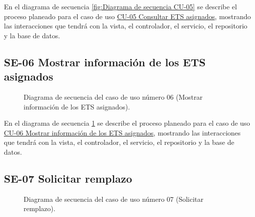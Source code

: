 En el diagrama de secuencia \ref{fig:Diagrama de secuencia CU-05} se describe el proceso planeado para el caso de uso \hyperlink{CU-05}{CU-05 Consultar ETS asignados}, mostrando las interacciones que tendrá con la vista, el controlador, el servicio, el repositorio y la base de datos.

\newpage

\subsection{SE-06 Mostrar información de los ETS asignados}

\begin{figure}[htbp!]
	\begin{center}
		\caption{Diagrama de secuencia del caso de uso número 06 (Mostrar información de los ETS asignados).}
		\label{fig:Diagrama de secuencia CU-06}
	\end{center}
\end{figure}

En el diagrama de secuencia \ref{fig:Diagrama de secuencia CU-06} se describe el proceso planeado para el caso de uso \hyperlink{CU-06}{CU-06 Mostrar información de los ETS asignados}, mostrando las interacciones que tendrá con la vista, el controlador, el servicio, el repositorio y la base de datos.

\newpage

\subsection{SE-07 Solicitar remplazo}

\begin{figure}[htbp!]
	\begin{center}
		\caption{Diagrama de secuencia del caso de uso número 07 (Solicitar remplazo).}
		\label{fig:Diagrama de secuencia CU-07}
	\end{center}
\end{figure}

